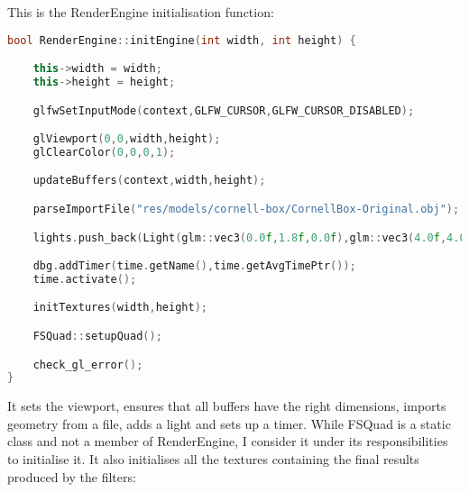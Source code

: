 This is the RenderEngine initialisation function:
\begin{lstlisting}[caption={RenderEngine.cpp},language=c++]
bool RenderEngine::initEngine(int width, int height) {

	this->width = width;
	this->height = height;

	glfwSetInputMode(context,GLFW_CURSOR,GLFW_CURSOR_DISABLED);

	glViewport(0,0,width,height);
	glClearColor(0,0,0,1);

	updateBuffers(context,width,height);

	parseImportFile("res/models/cornell-box/CornellBox-Original.obj");

	lights.push_back(Light(glm::vec3(0.0f,1.8f,0.0f),glm::vec3(4.0f,4.0f,4.0f)));

	dbg.addTimer(time.getName(),time.getAvgTimePtr());
	time.activate();

	initTextures(width,height);

	FSQuad::setupQuad();

	check_gl_error();
}
\end{lstlisting}
It sets the viewport, ensures that all buffers have the right dimensions, imports geometry from a file, adds a light and sets up a timer. While FSQuad is a static class and not a member of RenderEngine, I consider it under its responsibilities to initialise it. It also initialises all the textures containing the final results produced by the filters:

